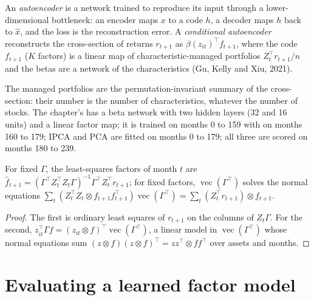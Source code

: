 \begin{definition}\label{def:ml:cross-sectional-deep-models:ae}
An \emph{autoencoder} is a network trained to reproduce its input through a lower-dimensional
bottleneck: an encoder maps $x$ to a code $h$, a decoder maps $h$ back to $\hat x$, and the loss is the reconstruction error.
A \emph{conditional autoencoder} reconstructs the cross-section of returns $r_{t+1}$ as
$\beta(z_{it})^\top f_{t+1}$, where the code $f_{t+1}$ ($K$ factors) is a linear map of characteristic-managed
portfolios $Z_t^\top r_{t+1}/n$ and the betas are a network of the characteristics (Gu, Kelly and Xiu, 2021).
\end{definition}

The managed portfolios are the permutation-invariant summary of the cross-section: their number is the number of
characteristics, whatever the number of stocks. The chapter's  has a beta network with two hidden layers (32
and 16 units) and a linear factor map; it is trained on months 0 to 159 with  on months 160 to 179; IPCA
and PCA are fitted on months 0 to 179; all three are scored on months 180 to 239.

\begin{proposition}\label{prop:ml:xsnet:ipca}
For fixed $\Gamma$, the least-squares factors of month $t$ are $\hat f_{t+1} = (\Gamma^\top Z_t^\top Z_t\Gamma)^{-1}\Gamma^\top
Z_t^\top r_{t+1}$; for fixed factors, $\operatorname{vec}(\Gamma^\top)$ solves the normal equations
$\sum_t(Z_t^\top Z_t\otimes f_{t+1}f_{t+1}^\top)\operatorname{vec}(\Gamma^\top) = \sum_t(Z_t^\top r_{t+1})\otimes f_{t+1}$.
\end{proposition}

\begin{proof}
The first is ordinary least squares of $r_{t+1}$ on the columns of $Z_t\Gamma$. For the second, $z_{it}^\top\Gamma f =
(z_{it}\otimes f)^\top\operatorname{vec}(\Gamma^\top)$, a linear model in $\operatorname{vec}(\Gamma^\top)$ whose normal
equations sum $(z\otimes f)(z\otimes f)^\top = zz^\top\otimes ff^\top$ over assets and months.
\end{proof}

\section{Evaluating a learned factor model}

